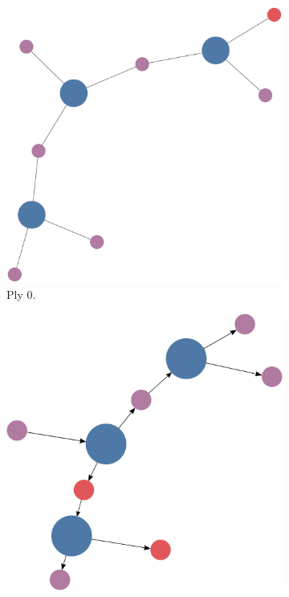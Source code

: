 \documentclass[titlepage,11pt]{article}
\begin{document}
\begin{figure}[!htb]
	\centering
	\begin{subfigure}[!htb]{0.32\textwidth}
		\centering
		\includegraphics[width=\columnwidth]{figures/knn_simple_backward_think_0.pdf}
		\caption{Ply 0.}
	\end{subfigure}
	\begin{subfigure}[!htb]{0.32\textwidth}
		\centering
		\includegraphics[width=\columnwidth]{figures/knn_simple_backward_think_1.pdf}

\end{subfigure}
\end{figure}
\end{document}
